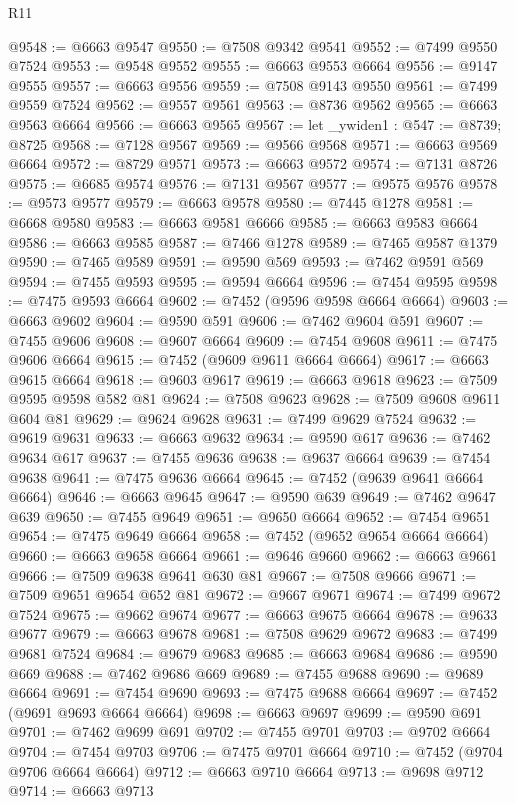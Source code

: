\begin{lexlean}{R11}
\begin{coremodule}
{{{{{{{{{{{{{{{{{{{{{{{{{{{{{{{{{{{{{{{{{{{{{{{{{{{{{{{{{{{{{{{{{{{{{{{{{{{{{{{{{{@9548 := @6663 @9547
@9550 := @7508 @9342 @9541
@9552 := @7499 @9550 @7524
@9553 := @9548 @9552
@9555 := @6663 @9553 @6664
@9556 := @9147 @9555
@9557 := @6663 @9556
@9559 := @7508 @9143 @9550
@9561 := @7499 @9559 @7524
@9562 := @9557 @9561
@9563 := @8736 @9562
@9565 := @6663 @9563 @6664
@9566 := @6663 @9565
@9567 := let _ywiden1 : @547 := @8739; @8725
@9568 := @7128 @9567
@9569 := @9566 @9568
@9571 := @6663 @9569 @6664
@9572 := @8729 @9571
@9573 := @6663 @9572
@9574 := @7131 @8726
@9575 := @6685 @9574
@9576 := @7131 @9567
@9577 := @9575 @9576
@9578 := @9573 @9577
@9579 := @6663 @9578
@9580 := @7445 @1278
@9581 := @6668 @9580
@9583 := @6663 @9581 @6666
@9585 := @6663 @9583 @6664
@9586 := @6663 @9585
@9587 := @7466 @1278
@9589 := @7465 @9587 @1379
@9590 := @7465 @9589
@9591 := @9590 @569
@9593 := @7462 @9591 @569
@9594 := @7455 @9593
@9595 := @9594 @6664
@9596 := @7454 @9595
@9598 := @7475 @9593 @6664
@9602 := @7452 (@9596 @9598 @6664 @6664)
@9603 := @6663 @9602
@9604 := @9590 @591
@9606 := @7462 @9604 @591
@9607 := @7455 @9606
@9608 := @9607 @6664
@9609 := @7454 @9608
@9611 := @7475 @9606 @6664
@9615 := @7452 (@9609 @9611 @6664 @6664)
@9617 := @6663 @9615 @6664
@9618 := @9603 @9617
@9619 := @6663 @9618
@9623 := @7509 @9595 @9598 @582 @81
@9624 := @7508 @9623
@9628 := @7509 @9608 @9611 @604 @81
@9629 := @9624 @9628
@9631 := @7499 @9629 @7524
@9632 := @9619 @9631
@9633 := @6663 @9632
@9634 := @9590 @617
@9636 := @7462 @9634 @617
@9637 := @7455 @9636
@9638 := @9637 @6664
@9639 := @7454 @9638
@9641 := @7475 @9636 @6664
@9645 := @7452 (@9639 @9641 @6664 @6664)
@9646 := @6663 @9645
@9647 := @9590 @639
@9649 := @7462 @9647 @639
@9650 := @7455 @9649
@9651 := @9650 @6664
@9652 := @7454 @9651
@9654 := @7475 @9649 @6664
@9658 := @7452 (@9652 @9654 @6664 @6664)
@9660 := @6663 @9658 @6664
@9661 := @9646 @9660
@9662 := @6663 @9661
@9666 := @7509 @9638 @9641 @630 @81
@9667 := @7508 @9666
@9671 := @7509 @9651 @9654 @652 @81
@9672 := @9667 @9671
@9674 := @7499 @9672 @7524
@9675 := @9662 @9674
@9677 := @6663 @9675 @6664
@9678 := @9633 @9677
@9679 := @6663 @9678
@9681 := @7508 @9629 @9672
@9683 := @7499 @9681 @7524
@9684 := @9679 @9683
@9685 := @6663 @9684
@9686 := @9590 @669
@9688 := @7462 @9686 @669
@9689 := @7455 @9688
@9690 := @9689 @6664
@9691 := @7454 @9690
@9693 := @7475 @9688 @6664
@9697 := @7452 (@9691 @9693 @6664 @6664)
@9698 := @6663 @9697
@9699 := @9590 @691
@9701 := @7462 @9699 @691
@9702 := @7455 @9701
@9703 := @9702 @6664
@9704 := @7454 @9703
@9706 := @7475 @9701 @6664
@9710 := @7452 (@9704 @9706 @6664 @6664)
@9712 := @6663 @9710 @6664
@9713 := @9698 @9712
@9714 := @6663 @9713
}}}}}}}}}}}}}}}}}}}}}}}}}}}}}}}}}}}}}}}}}}}}}}}}}}}}}}}}}}}}}}}}}}}}}}}}}}}}}}}}}}
\end{coremodule}
\end{lexlean}
